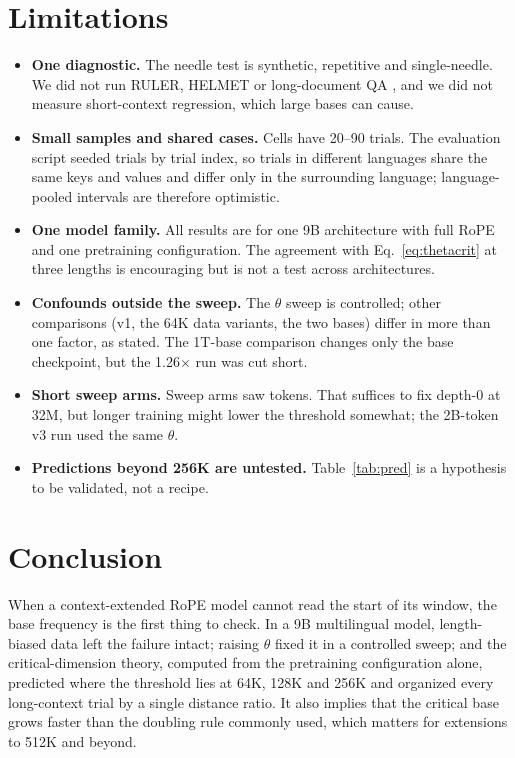 \documentclass[11pt]{article}
\begin{document}
\section{Limitations}
\begin{itemize}
\item \textbf{One diagnostic.} The needle test is synthetic, repetitive and single-needle. We did not run RULER, HELMET or long-document QA \citep{hsieh2024ruler,yen2025helmet}, and we did not measure short-context regression, which large bases can cause.
\item \textbf{Small samples and shared cases.} Cells have 20--90 trials. The evaluation script seeded trials by trial index, so trials in different languages share the same keys and values and differ only in the surrounding language; language-pooled intervals are therefore optimistic.
\item \textbf{One model family.} All results are for one 9B architecture with full RoPE and one pretraining configuration. The agreement with Eq.~\ref{eq:thetacrit} at three lengths is encouraging but is not a test across architectures.
\item \textbf{Confounds outside the sweep.} The $\theta$ sweep is controlled; other comparisons (v1, the 64K data variants, the two bases) differ in more than one factor, as stated. The 1T-base comparison changes only the base checkpoint, but the 1.26$\times$ run was cut short.
\item \textbf{Short sweep arms.} Sweep arms saw \sweepTokens{} tokens. That suffices to fix depth-0 at 32M, but longer training might lower the threshold somewhat; the 2B-token v3 run used the same $\theta$.
\item \textbf{Predictions beyond 256K are untested.} Table~\ref{tab:pred} is a hypothesis to be validated, not a recipe.
\end{itemize}

\section{Conclusion}
When a context-extended RoPE model cannot read the start of its window, the base frequency is the first thing to check. In a 9B multilingual model, length-biased data left the failure intact; raising $\theta$ fixed it in a controlled sweep; and the critical-dimension theory, computed from the pretraining configuration alone, predicted where the threshold lies at 64K, 128K and 256K and organized every long-context trial by a single distance ratio. It also implies that the critical base grows faster than the doubling rule commonly used, which matters for extensions to 512K and beyond.
\end{document}

